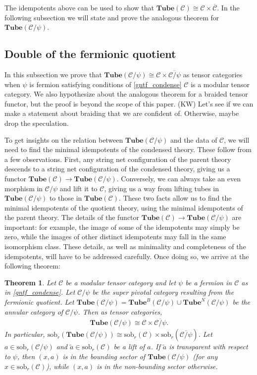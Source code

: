\documentclass[12pt,a4paper]{article}
\newtheorem{theorem}{Theorem}[subsection]
\newcounter{arrow}
\newcommand{\mcc}{\mathcal{C}}
\newcommand{\tube}{\textbf{Tube}}
\newcommand{\sob}{\text{sob}_r}
\newcommand{\kw}[1]{{\color{kwcolor}\footnotesize{(KW) #1}}}
\begin{document}
The idempotents above can be used to show that $\tube(\mcc) \cong \mcc \times \overline{\mcc}$.
In the following subsection we will state and prove the analogous theorem for $\tube(\mcc/\psi)$.



\subsection{Double of the fermionic quotient}

In this subsection we prove that $\tube(\mcc/\psi) \cong \mcc \times \overline{\mcc/\psi}$ as tensor categories
when $\psi$ is  fermion satisfying conditions of \ref{gntf_condense} $\mcc$ is a modular tensor category.
We also hypothesize about the analogous theorem for a braided tensor functor, 
but the proof is beyond the scope of this paper.
\kw{Let's see if we can make a statement about braiding that we are confident of.
Otherwise, maybe drop the speculation.}

To get insights on the relation between $\tube(\mcc/\psi)$ and the data of $\mcc$, we will need to find the minimal idempotents of the condensed theory.
These follow from a few observations. 
First, any string net configuration of the parent theory descends to a string net configuration of the condensed theory, 
giving us a functor $\tube(\mcc) \rightarrow \tube(\mcc/\psi)$.
Conversely, we can always take an even morphism in $\mcc/\psi$ and lift it to $\mcc$, giving 
us a way from lifting tubes in $\tube(\mcc/\psi)$ to those in $\tube(\mcc)$.
These two facts allow us to find the minimal idempotents of the quotient theory, 
using the minimal idempotents of the parent theory.
The details of the functor $\tube(\mcc) \rightarrow \tube(\mcc/\psi)$ are important:
for example, the image of some of the idempotents may simply be zero, 
while the images of other distinct idempotents may fall in the same isomorphism class. 
These details, as well as minimality and completeness of the idempotents, will have to be addressed carefully.
Once doing so, we arrive at the following theorem:

\begin{theorem}
Let ${\mcc}$ be a modular tensor category and let $\psi$ be a fermion in ${\mcc}$ as in \ref{gntf_condense}.
Let $\mcc/\psi$ be the super pivotal category resulting from the fermionic quotient.
Let
$
\tube(\mcc/\psi) = \tube^B(\mcc/\psi) \cup \tube^N(\mcc/\psi)
$
be the annular category of $\mcc/\psi$. 
Then as tensor categories,
\begin{align}
\tube(\mcc/\psi) \cong \mcc \times \overline{\mcc/\psi}.
\end{align}
In particular, $\sob(\tube(\mcc/\psi)) \cong \sob({\mcc}) \times \sob(\overline{\mcc/\psi})$. 
Let $a \in \sob(\mcc/\psi)$ and $\tilde{a} \in \sob({\mcc})$ be a lift of $a$.
If $\tilde a$ is transparent with respect to $\psi$, then $(x, a)$ is in the bounding sector of $\tube(\mcc/\psi)$
(for any $x\in\sob(\mcc)$), while
$(x, a)$ is in the non-bounding sector otherwise.
\label{minimal_idempotents_modular_C/psi}
\end{theorem}
\end{document}
